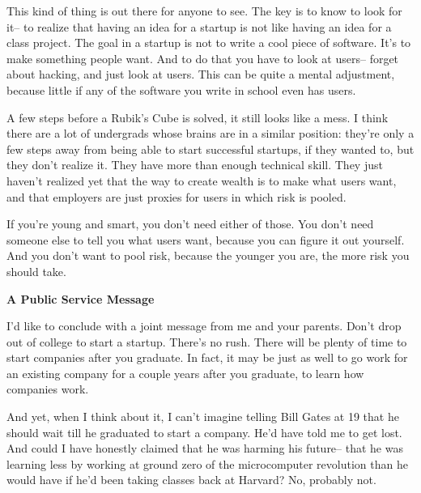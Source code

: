 This kind of thing
                  is out there for anyone to see. The key is to know to look for
                  it-- to realize that having an idea for a startup is not like
                  having an idea for a class project. The goal in a startup is
                  not to write a cool piece of software. It's to make something
                  people want. And to do that you have to look at users-- forget
                  about hacking, and just look at users. This can be quite a
                  mental adjustment, because little if any of the software you
                  write in school even has users.
                  

A few steps before a Rubik's Cube is solved, it still
                  looks like a mess. I think there are a lot of undergrads whose
                  brains are in a similar position: they're only a few steps
                  away from being able to start successful startups, if they
                  wanted to, but they don't realize it. They have more than
                  enough technical skill. They just haven't realized yet that
                  the way to create wealth is to make what users want, and that
                  employers are just proxies for users in which risk is
                  pooled.

If you're young and smart, you don't need
                  either of those. You don't need someone else to tell you what
                  users want, because you can figure it out yourself. And you
                  don't want to pool risk, because the younger you are, the more
                  risk you should take.

\textbf{A Public Service Message}

I'd like to conclude with a joint message from me
                  and your parents. Don't drop out of college to start a
                  startup. There's no rush. There will be plenty of time to
                  start companies after you graduate. In fact, it may be just as
                  well to go work for an existing company for a couple years
                  after you graduate, to learn how companies work.

And
                  yet, when I think about it, I can't imagine telling Bill Gates
                  at 19 that he should wait till he graduated to start a
                  company. He'd have told me to get lost. And could I have
                  honestly claimed that he was harming his future-- that he was
                  learning less by working at ground zero of the microcomputer
                  revolution than he would have if he'd been taking classes back
                  at Harvard? No, probably not.

